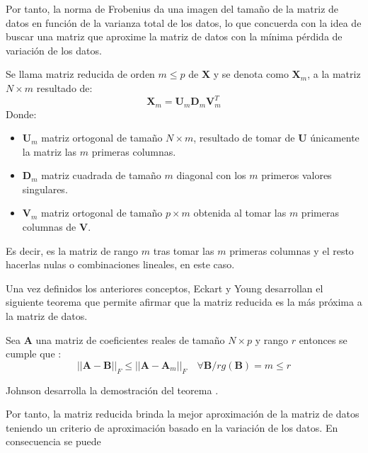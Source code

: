 \noindent Por tanto, la norma de Frobenius da una imagen del tamaño de la matriz de datos en función de la varianza total de los datos, lo que concuerda con la idea de buscar una matriz que aproxime la matriz de datos con la mínima pérdida de variación de los datos.  

\begin{defi}
Se llama matriz reducida de orden $m\leq p$ de $\textbf{X}$ y se denota como $\textbf{X}_m$, a la matriz $N\times m $ resultado de:
\begin{equation}
\textbf{X}_m=\textbf{U}_m\mathbf{D}_m\textbf{V}^T_m
\end{equation}
Donde:
\begin{itemize}
\item $\textbf{U}_m$ matriz ortogonal de tamaño $N \times m$, resultado de tomar de \textbf{U} únicamente la matriz las $m$ primeras columnas. 
\item $\mathbf{D}_m$  matriz cuadrada de tamaño $m$ diagonal con los $m$ primeros valores singulares. 
\item $\textbf{V}_m$ matriz ortogonal de tamaño $p \times m$ obtenida al tomar las $m$ primeras columnas de \textbf{V}.
\end{itemize}
Es decir, es la matriz de rango $m$ tras tomar las  $m$ primeras columnas y el resto hacerlas nulas o combinaciones lineales, en este caso.
\end{defi}

\noindent Una vez definidos los anteriores conceptos, Eckart y Young desarrollan el siguiente teorema que permite afirmar que la matriz reducida es la más próxima a la matriz de datos\cite{Eckart 1936, Golub 1987}.

\begin{teorema}
Sea \textbf{A} una matriz de coeficientes reales de tamaño $N\times p$ y rango $r$  entonces se cumple que :
\begin{equation}
||\textbf{A}-\textbf{B}||_F\leq ||\textbf{A}-\textbf{A}_m||_F \quad \forall \textbf{B}/ rg(\textbf{B})=m \leq r
\end{equation} 
\end{teorema}

\noindent Johnson desarrolla la demostración del teorema \cite{Johnson 1963}. 

\noindent Por tanto, la matriz reducida brinda la mejor aproximación de la matriz de datos teniendo un criterio de aproximación basado en la variación de los datos. En consecuencia se puede 

